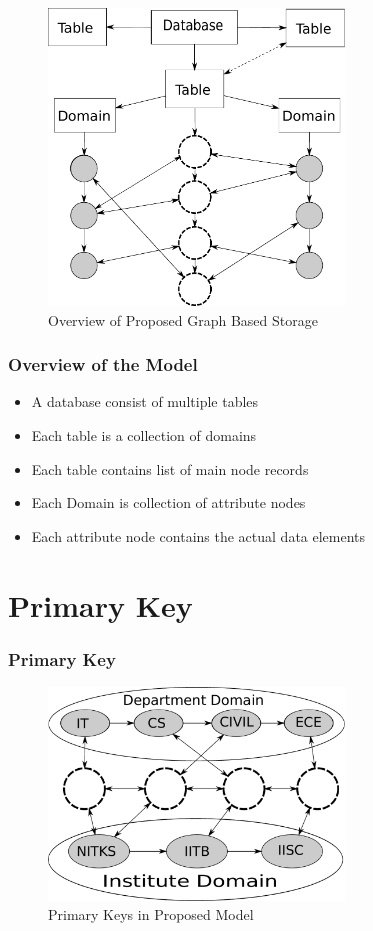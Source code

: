\documentclass[12pt,xcolor=dvipsnames]{beamer}
\begin{document}
\begin{frame}
\begin{figure}[t]
 \centering
 \includegraphics[width=0.7\textwidth]{pics/model.pdf}
 \caption{Overview of Proposed Graph Based Storage}
 \label{fig:overview}
\end{figure}
\end{frame}

\begin{frame}
 \frametitle{Overview of the Model}
 \begin{itemize}
  \item<1-> A database consist of multiple tables
  \item<1-> Each table is a collection of domains
  \item<1-> Each table contains list of main node records
  \item<2-> Each Domain is collection of attribute nodes
  \item<3-> Each attribute node contains the actual data elements
 \end{itemize}
\end{frame}

\section{Primary Key}
\begin{frame}
 \frametitle{Primary Key}
 \begin{figure}
 \centering
 \includegraphics[width=0.7\textwidth]{pics/primary_key.pdf}
 \caption{Primary Keys in Proposed Model}
 \label{fig:primary_key}
\end{figure}
\end{frame}
\end{document}
